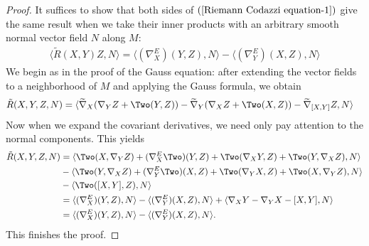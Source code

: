 \begin{proof}
It suffices to show that both sides of $(\ref{Riemann Codazzi equation-1})$ give the same result when we take their inner products with an arbitrary smooth normal vector 
field $N$ along $M$:
\begin{align}\label{Riemann Codazzi equation-2}
\langle\tilde{R}(X,Y)Z,N\rangle=\langle(\nabla^E_X)(Y,Z),N\rangle-\langle(\nabla^E_Y)(X,Z),N\rangle
\end{align}
We begin as in the proof of the Gauss equation: after extending the vector fields to a neighborhood of $M$ and applying the Gauss formula, we obtain
\begin{align*}
\tilde{R}(X,Y,Z,N)&=\langle\widetilde{\nabla}_X(\nabla_YZ+\Two(Y,Z))-\widetilde{\nabla}_Y(\nabla_XZ+\Two(X,Z))-\widetilde{\nabla}_{[X,Y]}Z,N\rangle
\end{align*}
Now when we expand the covariant derivatives, we need only pay attention to the normal components. This yields
\begin{align*}
\tilde{R}(X,Y,Z,N)&=\langle\Two(X,\nabla_YZ)+(\nabla^E_X\Two)(Y,Z)+\Two(\nabla_XY,Z)+\Two(Y,\nabla_XZ),N\rangle\\
&-\langle\Two(Y,\nabla_XZ)+(\nabla^E_Y\Two)(X,Z)+\Two(\nabla_YX,Z)+\Two(X,\nabla_YZ),N\rangle\\
&-\langle\Two([X,Y],Z),N\rangle\\
&=\langle(\nabla^E_X)(Y,Z),N\rangle-\langle(\nabla^E_Y)(X,Z),N\rangle+\langle\nabla_XY-\nabla_YX-[X,Y],N\rangle\\
&=\langle(\nabla^E_X)(Y,Z),N\rangle-\langle(\nabla^E_Y)(X,Z),N\rangle.
\end{align*}
This finishes the proof.
\end{proof}
